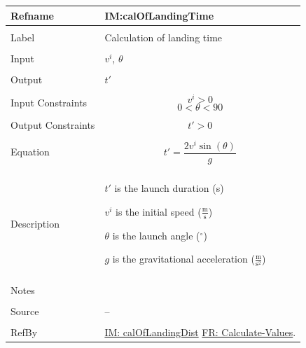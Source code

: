 \documentclass[12pt]{article}
\begin{document}
\noindent \begin{minipage}{\textwidth}
\begin{tabular}{p{} p{}}
\toprule \textbf{Refname} & \textbf{IM:calOfLandingTime}
\label{IM:calOfLandingTime}
\\ \midrule \\
Label & Calculation of landing time
\\ \midrule \\
Input & ${v^{i}}$, $θ$
\\ \midrule \\
Output & $t'$
\\ \midrule \\
Input Constraints & \begin{displaymath}
                    {v^{i}}>0
                    \end{displaymath}
                    \begin{displaymath}
                    0<θ<90
                    \end{displaymath}
\\ \midrule \\
Output Constraints & \begin{displaymath}
                     t'>0
                     \end{displaymath}
\\ \midrule \\
Equation & \begin{displaymath}
           t'=\frac{2 {v^{i}} \sin\left(θ\right)}{g}
           \end{displaymath}
\\ \midrule \\
Description & \begin{symbDescription}
              \item{$t'$ is the launch duration (s)}
              \item{${v^{i}}$ is the initial speed ($\frac{\text{m}}{\text{s}}$)}
              \item{$θ$ is the launch angle (${}^{\circ}$)}
              \item{$g$ is the gravitational acceleration ($\frac{\text{m}}{\text{s}^{2}}$)}
              \end{symbDescription}
\\ \midrule \\
Notes & 
\\ \midrule \\
Source & --
\\ \midrule \\
RefBy & \hyperref[IM:calOfLandingDist]{IM: calOfLandingDist} \hyperref[calcValues]{FR: Calculate-Values}.
\\ \bottomrule \end{tabular}
\end{minipage}
\end{document}
